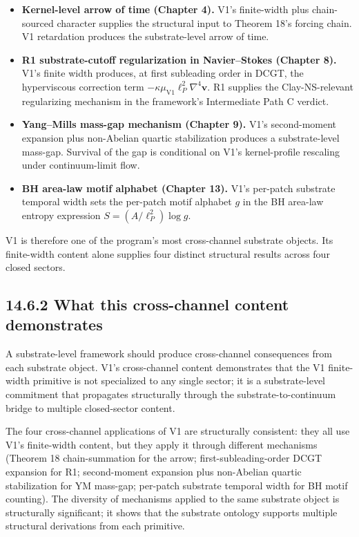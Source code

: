 \documentclass[11pt]{book}
\begin{document}
\begin{itemize}
\item \textbf{Kernel-level arrow of time (Chapter 4).} V1's finite-width plus chain-sourced character supplies the structural input to Theorem 18's forcing chain. V1 retardation produces the substrate-level arrow of time.
\item \textbf{R1 substrate-cutoff regularization in Navier–Stokes (Chapter 8).} V1's finite width produces, at first subleading order in DCGT, the hyperviscous correction term $-\kappa\mu_{\mathrm{V1}}\ell_P^2\nabla^4\mathbf{v}$. R1 supplies the Clay-NS-relevant regularizing mechanism in the framework's Intermediate Path C verdict.
\item \textbf{Yang–Mills mass-gap mechanism (Chapter 9).} V1's second-moment expansion plus non-Abelian quartic stabilization produces a substrate-level mass-gap. Survival of the gap is conditional on V1's kernel-profile rescaling under continuum-limit flow.
\item \textbf{BH area-law motif alphabet (Chapter 13).} V1's per-patch substrate temporal width sets the per-patch motif alphabet $g$ in the BH area-law entropy expression $S = (A/\ell_P^2)\log g$.
\end{itemize}

V1 is therefore one of the program's most cross-channel substrate objects. Its finite-width content alone supplies four distinct structural results across four closed sectors.

\subsection{14.6.2 What this cross-channel content demonstrates}

A substrate-level framework should produce cross-channel consequences from each substrate object. V1's cross-channel content demonstrates that the V1 finite-width primitive is not specialized to any single sector; it is a substrate-level commitment that propagates structurally through the substrate-to-continuum bridge to multiple closed-sector content.

The four cross-channel applications of V1 are structurally consistent: they all use V1's finite-width content, but they apply it through different mechanisms (Theorem 18 chain-summation for the arrow; first-subleading-order DCGT expansion for R1; second-moment expansion plus non-Abelian quartic stabilization for YM mass-gap; per-patch substrate temporal width for BH motif counting). The diversity of mechanisms applied to the same substrate object is structurally significant; it shows that the substrate ontology supports multiple structural derivations from each primitive.
\end{document}

